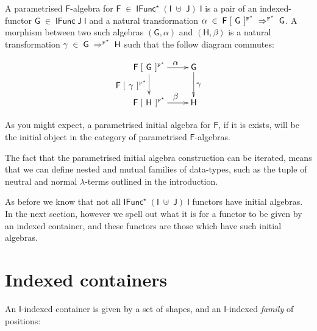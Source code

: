 \documentclass[a4paper]{article}
\newcommand{\Conid}[1]{\mathit{#1}}
\newcommand{\Varid}[1]{\mathit{#1}}
\renewcommand\Varid[1]{\mathord{\textsf{#1}}}
\let\Conid\Varid
\begin{document}
\noindent
A parametrised \ensuremath{\Conid{F}}-algebra for \ensuremath{\Conid{F}\;\in\;\Conid{IFunc}^{\star}\;(\Conid{I}\;\uplus\;\Conid{J})\;\Conid{I}} is a pair of an 
indexed-functor \ensuremath{\Conid{G}\;\in\;\Conid{IFunc}\;\Conid{J}\;\Conid{I}} and a natural transformation
\ensuremath{\alpha\;\in\;\Conid{F}\;[\mskip1.5mu \;\Conid{G}\;\mskip1.5mu]^{\text{\tiny{F}}^{\star}}\;\Rightarrow^{\text{\tiny F}^{\star}}\;\Conid{G}}. A morphism between two such algebras 
\ensuremath{(\Conid{G},\alpha)} and \ensuremath{(\Conid{H},\beta)} is a natural transformation \ensuremath{\gamma\;\in\;\Conid{G}\;\Rightarrow^{\text{\tiny F}^{\star}}\;\Conid{H}} 
such that the follow diagram commutes:

\[
\xymatrix{
\mbox{\ensuremath{\Conid{F}\;[\mskip1.5mu \;\Conid{G}\;\mskip1.5mu]^{\text{\tiny{F}}^{\star}}}}  \ar[r]^{\quad\mbox{\ensuremath{\alpha}}} 
\ar[d]_{\mbox{\ensuremath{\Conid{F}\;[\mskip1.5mu \;\gamma\;\mskip1.5mu]^{\text{\tiny{F}}^{\star}}}}} & \mbox{\ensuremath{\Conid{G}}} \ar[d]^{\mbox{\ensuremath{\gamma}}}\\
\mbox{\ensuremath{\Conid{F}\;[\mskip1.5mu \;\Conid{H}\;\mskip1.5mu]^{\text{\tiny{F}}^{\star}}}} \ar[r]^{\quad\mbox{\ensuremath{\beta}}} & \mbox{\ensuremath{\Conid{H}}}}
\]

\noindent
As you might expect, a parametrised initial algebra for \ensuremath{\Conid{F}}, if it is exists, 
will be the initial object in the category of parametrised \ensuremath{\Conid{F}}-algebras. 

The fact that the parametrised initial algebra construction can be iterated, 
means that we can define nested and mutual families of data-types, such as the
tuple of neutral and normal \ensuremath{\lambda}-terms outlined in the introduction. 

As before we know that not all \ensuremath{\Conid{IFunc}^{\star}\;(\Conid{I}\;\uplus\;\Conid{J})\;\Conid{I}} functors have initial 
algebras. In the next section, however we spell out what it is for a functor to 
be given by an indexed container, and these functors are those which have such 
initial algebras.



\section{Indexed containers}
\label{sec:icont}


An \ensuremath{\Conid{I}}-indexed container is given by a set of shapes, and an \ensuremath{\Conid{I}}-indexed \emph{family} of positions:
\end{document}
